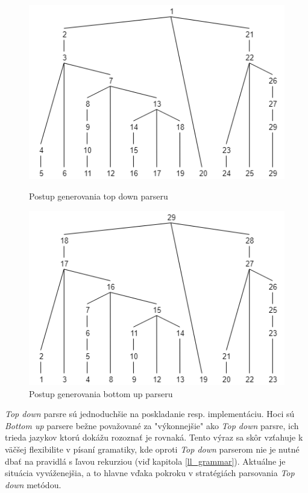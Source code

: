 \begin{figure}[H]
  \centering
  \begin{minipage}[b]{0.45\textwidth}
    \includegraphics[width=\textwidth]{figures/parseTreeExampleTopDown.png}
    \caption{Postup generovania top down parseru}
    \label{fig:parseTreeExampleTopDown}
  \end{minipage}
  \hfill
  \begin{minipage}[b]{0.45\textwidth}
    \includegraphics[width=\textwidth]{figures/parseTreeExampleBottomUp.png}
    \caption{Postup generovania bottom up parseru}
    \label{fig:parseTreeExampleBottomUp}
  \end{minipage}
\end{figure}

\textit{Top down} parsre sú jednoduchšie na poskladanie resp. implementáciu. Hoci sú \textit{Bottom up} parsere bežne považované za "výkonnejšie"{ }ako \textit{Top down} parsre, ich trieda jazykov ktorú dokážu rozoznať je rovnaká\cite{aho1972theory}. Tento výraz sa skôr vzťahuje k väčšej flexibilite v písaní gramatiky, kde oproti \textit{Top down} parserom nie je nutné dbať na pravidlá s ľavou rekurziou (viď kapitola \ref{ll_grammar}). Aktuálne je situácia vyváženejšia, a to hlavne vďaka pokroku v stratégiách parsovania \textit{Top down} metódou. 

